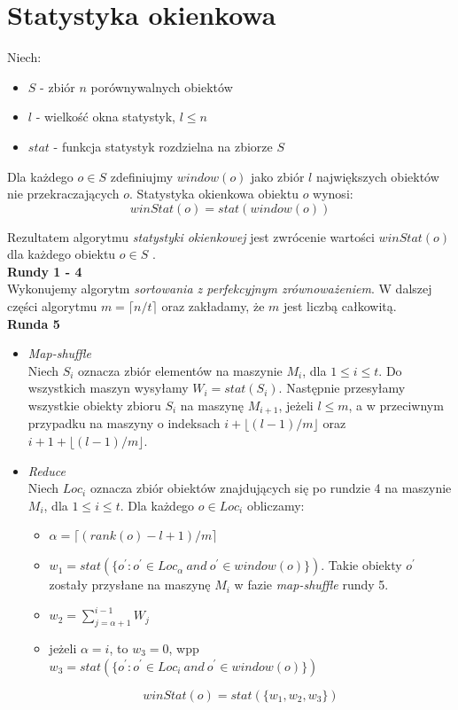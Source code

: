 \documentclass[licencjacka]{pracamgr}
\begin{document}
\section{Statystyka okienkowa}
Niech:
\begin{itemize}
    \item \(S\) - zbiór \(n\) porównywalnych obiektów
    \item \(l\) - wielkość okna statystyk, \(l \leq n\)
    \item \(stat\) - funkcja statystyk rozdzielna na zbiorze \(S\)
\end{itemize}

Dla każdego \(o \in S\) zdefiniujmy \(window(o)\) jako zbiór \(l\) największych obiektów nie przekraczających \(o\). Statystyka okienkowa obiektu \(o\) wynosi:
$$winStat(o) = stat(window(o))$$

Rezultatem algorytmu \textit{statystyki okienkowej} jest zwrócenie wartości \(winStat(o)\) dla każdego obiektu \(o \in S\) \cite{tao2013minimal}. \\

\textbf{Rundy 1 - 4} \\
Wykonujemy algorytm \textit{sortowania z perfekcyjnym zrównoważeniem}. W dalszej części algorytmu \(m = \lceil n / t \rceil\) oraz zakładamy, że \(m\) jest liczbą całkowitą. \\

\textbf{Runda 5}
\begin{itemize}
    \item \textit{Map-shuffle} \\
    Niech \(S_i\) oznacza zbiór elementów na maszynie \(M_i\), dla \(1 \leq i \leq t\). Do wszystkich maszyn wysyłamy \(W_i = stat(S_i)\). Następnie przesyłamy wszystkie obiekty zbioru \(S_i\) na maszynę \(M_{i+1}\), jeżeli \(l \leq m\), a w przeciwnym przypadku na maszyny o indeksach \(i + \lfloor (l - 1) / m \rfloor\) oraz \(i+1+\lfloor (l-1)/m \rfloor \).
    
    \item \textit{Reduce} \\
    Niech \(Loc_i\) oznacza zbiór obiektów znajdujących się po rundzie 4 na maszynie \(M_i\), dla \(1 \leq i \leq t\). Dla każdego \(o \in Loc_i\) obliczamy:
    \begin{itemize}
        \item \(\alpha = \lceil (rank(o) - l + 1) / m \rceil\)
        \item \(w_1 = stat(\{o^\prime : o^\prime \in Loc_\alpha \ and \ o^\prime \in window(o)\})\). Takie obiekty \(o^\prime\) zostały przysłane na maszynę \(M_i\) w fazie \textit{map-shuffle} rundy 5.
        \item $w_2 = \sum_{j=\alpha+1}^{i-1} W_j$
        \item jeżeli \(\alpha = i\), to \(w_3 = 0\), wpp \(w_3 = stat(\{o^\prime : o^\prime \in Loc_i \ and \ o^\prime \in window(o)\})\)
    \end{itemize}
    
    $$winStat(o) = stat(\{w_1, w_2, w_3\})$$
\end{itemize}
\end{document}
